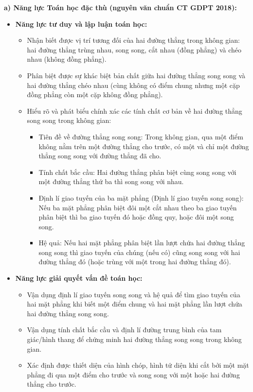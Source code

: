 \documentclass[12pt, a4paper]{article}
\begin{document}
\textbf{a) Năng lực Toán học đặc thù (nguyên văn chuẩn CT GDPT 2018):}
\begin{itemize}[leftmargin=1.5em]
    \item \textbf{Năng lực tư duy và lập luận toán học:}
    \begin{itemize}
        \item Nhận biết được vị trí tương đối của hai đường thẳng trong không gian: hai đường thẳng trùng nhau, song song, cắt nhau (đồng phẳng) và chéo nhau (không đồng phẳng).
        \item Phân biệt được sự khác biệt bản chất giữa hai đường thẳng song song và hai đường thẳng chéo nhau (cùng không có điểm chung nhưng một cặp đồng phẳng còn một cặp không đồng phẳng).
        \item Hiểu rõ và phát biểu chính xác các tính chất cơ bản về hai đường thẳng song song trong không gian:
        \begin{itemize}
            \item Tiên đề về đường thẳng song song: Trong không gian, qua một điểm không nằm trên một đường thẳng cho trước, có một và chỉ một đường thẳng song song với đường thẳng đã cho.
            \item Tính chất bắc cầu: Hai đường thẳng phân biệt cùng song song với một đường thẳng thứ ba thì song song với nhau.
            \item Định lí giao tuyến của ba mặt phẳng (Định lí giao tuyến song song): Nếu ba mặt phẳng phân biệt đôi một cắt nhau theo ba giao tuyến phân biệt thì ba giao tuyến đó hoặc đồng quy, hoặc đôi một song song.
            \item Hệ quả: Nếu hai mặt phẳng phân biệt lần lượt chứa hai đường thẳng song song thì giao tuyến của chúng (nếu có) cũng song song với hai đường thẳng đó (hoặc trùng với một trong hai đường thẳng đó).
        \end{itemize}
    \end{itemize}
    \item \textbf{Năng lực giải quyết vấn đề toán học:}
    \begin{itemize}
        \item Vận dụng định lí giao tuyến song song và hệ quả để tìm giao tuyến của hai mặt phẳng khi biết một điểm chung và hai mặt phẳng lần lượt chứa hai đường thẳng song song.
        \item Vận dụng tính chất bắc cầu và định lí đường trung bình của tam giác/hình thang để chứng minh hai đường thẳng song song trong không gian.
        \item Xác định được thiết diện của hình chóp, hình tứ diện khi cắt bởi một mặt phẳng đi qua một điểm cho trước và song song với một hoặc hai đường thẳng cho trước.

\end{itemize}
\end{itemize}
\end{document}
